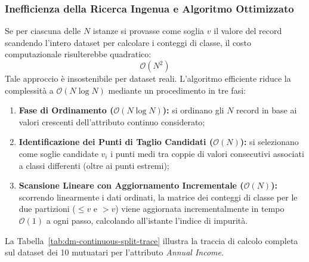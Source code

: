 \subsubsection{Inefficienza della Ricerca Ingenua e Algoritmo Ottimizzato}
Se per ciascuna delle $N$ istanze si provasse come soglia $v$ il valore del record scandendo l'intero dataset per calcolare i conteggi di classe, il costo computazionale risulterebbe quadratico:
\begin{equation}
    \mathcal{O}(N^2)
\end{equation}
Tale approccio è insostenibile per dataset reali. L'algoritmo efficiente riduce la complessità a $\mathcal{O}(N \log N)$ mediante un procedimento in tre fasi:
\begin{enumerate}
    \item \textbf{Fase di Ordinamento ($\mathcal{O}(N \log N)$):} si ordinano gli $N$ record in base ai valori crescenti dell'attributo continuo considerato;
    \item \textbf{Identificazione dei Punti di Taglio Candidati ($\mathcal{O}(N)$):} si selezionano come soglie candidate $v_i$ i punti medi tra coppie di valori consecutivi associati a classi differenti (oltre ai punti estremi);
    \item \textbf{Scansione Lineare con Aggiornamento Incrementale ($\mathcal{O}(N)$):} scorrendo linearmente i dati ordinati, la matrice dei conteggi di classe per le due partizioni ($\le v$ e $> v$) viene aggiornata incrementalmente in tempo $\mathcal{O}(1)$ a ogni passo, calcolando all'istante l'indice di impurità.
\end{enumerate}

La Tabella~\ref{tab:dm-continuous-split-trace} illustra la traccia di calcolo completa sul dataset dei 10 mutuatari per l'attributo \textit{Annual Income}.

